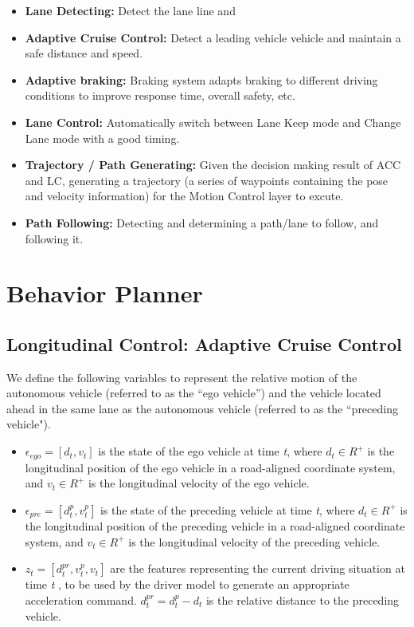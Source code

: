 \begin{itemize}
\item \textbf {Lane Detecting:} Detect the lane line and 
\item \textbf{Adaptive Cruise Control:} Detect a leading vehicle vehicle and maintain a safe distance and speed.
\item \textbf{Adaptive braking:} Braking system adapts braking to different driving conditions to improve response time, overall safety, etc.
\item \textbf{Lane Control:} Automatically switch between Lane Keep mode and Change Lane mode with a good timing.
\item \textbf{Trajectory / Path Generating:} Given the decision making result of ACC and LC, generating a trajectory (a series of waypoints containing the pose and velocity information) for the Motion Control layer to excute.
\item \textbf{Path Following:} Detecting and determining a path/lane to follow, and following it.
\end{itemize}

\section{Behavior Planner}

\subsection{Longitudinal Control:  Adaptive Cruise Control}

We define the following variables to represent the relative motion of the autonomous vehicle (referred to as the ``ego vehicle'') and the vehicle located ahead in the same lane as the autonomous vehicle (referred to as the ``preceding vehicle").

\begin{itemize}
\item $\epsilon_{ego} = [d_t, v_t]$ is the state of the ego vehicle at time \textit{t}, where $d_t \in R^+$ is the longitudinal position of the ego vehicle in a road-aligned coordinate system, and $v_t \in R^+$ is the longitudinal velocity of the ego vehicle.
\item $\epsilon_{pre} = [d_t^p, v_t^p]$ is the state of the preceding vehicle at time \textit{t}, where $d_t \in R^+$ is the longitudinal position of the preceding vehicle in a road-aligned coordinate system, and $v_t \in R^+$ is the longitudinal velocity of the preceding vehicle.
\item $z_t =  [d_t^{pr}, v_t^p, v_t]$ are the features representing the current driving situation at time \textit{t} , to be used by the driver model to generate an appropriate acceleration command. $d_t^{pr} = d_t^p - d_t$ is the relative distance to the preceding vehicle.
\end{itemize}

